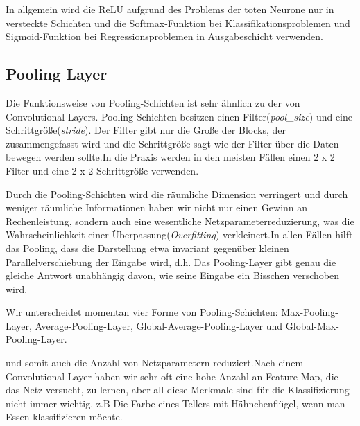\documentclass[12pt,a4paper]{scrartcl}
\numberwithin{equation}{section}
\begin{document}
In allgemein wird die ReLU aufgrund des Problems der toten Neurone nur in versteckte Schichten und die Softmax-Funktion bei Klassifikationsproblemen und Sigmoid-Funktion bei Regressionsproblemen in Ausgabeschicht verwenden.

\subsection{Pooling Layer}
Die Funktionsweise von Pooling-Schichten ist sehr ähnlich zu der von Convolutional-Layers.
Pooling-Schichten besitzen einen Filter(\textit{pool\_size}) und eine Schrittgröße(\textit{stride}).
Der Filter gibt nur die Große der Blocks, der zusammengefasst wird und die Schrittgröße sagt wie der Filter über die Daten bewegen werden sollte.In die Praxis werden in den meisten Fällen einen 2 x 2 Filter und eine 2 x 2 Schrittgröße verwenden.

 Durch die Pooling-Schichten wird die räumliche Dimension verringert und durch weniger räumliche Informationen haben wir nicht nur einen Gewinn an Rechenleistung, sondern auch eine wesentliche Netzparameterreduzierung, was die Wahrscheinlichkeit einer Überpassung(\textit{Overfitting}) verkleinert.In allen Fällen hilft das Pooling, dass die Darstellung etwa invariant gegenüber kleinen Parallelverschiebung der Eingabe wird\cite{4}, d.h. Das Pooling-Layer gibt genau die gleiche Antwort unabhängig davon, wie seine Eingabe ein Bisschen verschoben wird.
 
 Wir unterscheidet momentan vier Forme von Pooling-Schichten:
Max-Pooling-Layer, Average-Pooling-Layer, Global-Average-Pooling-Layer und Global-Max-Pooling-Layer.


 und somit auch die Anzahl von Netzparametern reduziert.Nach einem Convolutional-Layer haben wir sehr oft eine hohe Anzahl an Feature-Map, die das Netz versucht, zu lernen, aber all diese Merkmale sind für die Klassifizierung nicht immer wichtig. z.B Die Farbe eines Tellers mit Hähnchenflügel, wenn man Essen klassifizieren möchte.
\end{document}
